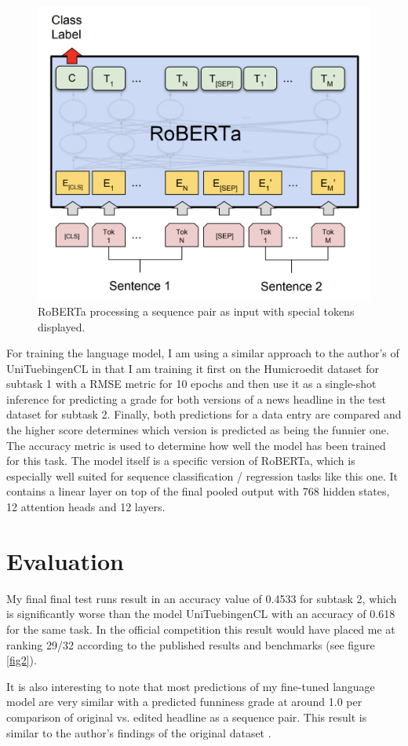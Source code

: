 \documentclass[11pt,a4paper,onecolumn,oneside,notitlepage]{article}
\begin{document}
	\begin{figure}
		\begin{center}
			\includegraphics[width=0.4\linewidth]{images/roberta_sequence.png}
		\end{center}
		\caption{RoBERTa processing a sequence pair as input with special tokens displayed.}\label{fig1}
	\end{figure}

	For training the language model, I am using a similar approach to the author's of UniTuebingenCL \citep{ammer-gruner-2020-unituebingencl} in that I am training it first on the Humicroedit dataset for subtask 1 with a RMSE metric for 10 epochs and then use it as a single-shot inference for predicting a grade for both versions of a news headline in the test dataset for subtask 2. Finally, both predictions for a data entry are compared and the higher score determines which version is predicted as being the funnier one. The accuracy metric is used to determine how well the model has been trained for this task. The model itself is a specific version of RoBERTa, which is especially well suited for sequence classification / regression tasks like this one. It contains a linear layer on top of the final pooled output with 768 hidden states, 12 attention heads and 12 layers.


	\section{Evaluation}
	My final final test runs result in an accuracy value of 0.4533 for subtask 2, which is significantly worse than the model UniTuebingenCL \citep{ammer-gruner-2020-unituebingencl} with an accuracy of 0.618 for the same task. In the official competition this result would have placed me at ranking 29/32 according to the published results and benchmarks (see figure \ref{fig2}).

	It is also interesting to note that most predictions of my fine-tuned language model are very similar with a predicted funniness grade at around 1.0 per comparison of original vs. edited headline as a sequence pair. This result is similar to the author's findings of the original dataset \citep{hossain-etal-2019-president}.
\end{document}
